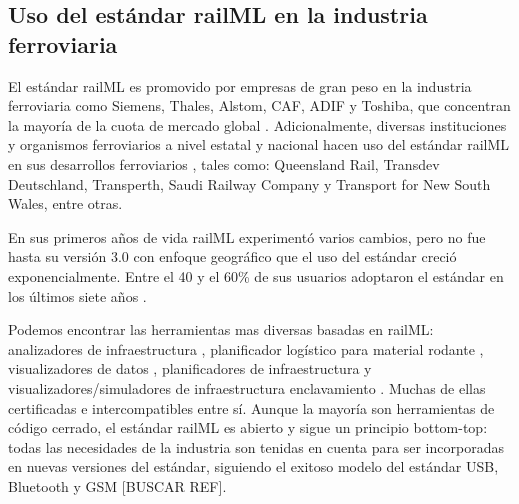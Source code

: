 \subsection{Uso del estándar railML en la industria ferroviaria}

    El estándar railML es promovido por empresas de gran peso en la industria ferroviaria como Siemens, Thales, Alstom, CAF, ADIF y Toshiba, que concentran la mayoría de la cuota de mercado global \cite{PARTNERS}. Adicionalmente, diversas instituciones y organismos ferroviarios a nivel estatal y nacional hacen uso del estándar railML en sus desarrollos ferroviarios \cite{PARTNERS}, tales como: Queensland Rail, Transdev Deutschland, Transperth, Saudi Railway Company y Transport for New South Wales, entre otras.

    En sus primeros años de vida railML experimentó varios cambios, pero no fue hasta su versión 3.0 con enfoque geográfico que el uso del estándar creció exponencialmente. Entre el 40 y el 60\% de sus usuarios adoptaron el estándar en los últimos siete años \cite{PARTNERS}.

    Podemos encontrar las herramientas mas diversas basadas en railML: analizadores de infraestructura \cite{MAPREX}, planificador logístico para material rodante \cite{IVU}, visualizadores de datos \cite{RAILVIVID}, planificadores de infraestructura \cite{VISALL3D} y visualizadores/simuladores de infraestructura enclavamiento \cite{DESIGN4RAIL}. Muchas de ellas certificadas e intercompatibles entre sí. Aunque la mayoría son herramientas de código cerrado, el estándar railML es abierto y sigue un principio bottom-top: todas las necesidades de la industria son tenidas en cuenta para ser incorporadas en nuevas versiones del estándar, siguiendo el exitoso modelo del estándar USB, Bluetooth y GSM [BUSCAR REF]. 